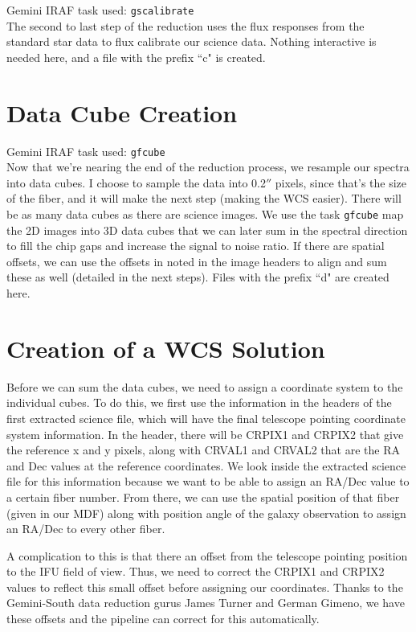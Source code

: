 \documentclass[12pt]{report}
\begin{document}
\noindent Gemini IRAF task used: \texttt{gscalibrate}\\

\noindent The second to last step of the reduction uses the flux responses from the standard star data to flux calibrate our science data. Nothing interactive is needed here, and a file with the prefix ``c" is created.

\bigskip
\section{Data Cube Creation}

\noindent Gemini IRAF task used: \texttt{gfcube}\\

\noindent Now that we're nearing the end of the reduction process, we resample our spectra into data cubes. I choose to sample the data into 0.2$''$ pixels, since that's the size of the fiber, and it will make the next step (making the WCS easier). There will be as many data cubes as there are science images. We use the task \texttt{gfcube} map the 2D images into 3D data cubes that we can later sum in the spectral direction to fill the chip gaps and increase the signal to noise ratio. If there are spatial offsets, we can use the offsets in noted in the image headers to align and sum these as well (detailed in the next steps). Files with the prefix ``d" are created here.

\bigskip
\section{Creation of a WCS Solution}

Before we can sum the data cubes, we need to assign a coordinate system to the individual cubes. To do this, we first use the information in the headers of the first extracted science file, which will have the final telescope pointing coordinate system information. In the header, there will be CRPIX1 and CRPIX2 that give the reference x and y pixels, along with CRVAL1 and CRVAL2 that are the RA and Dec values at the reference coordinates. We look inside the extracted science file for this information because we want to be able to assign an RA/Dec value to a certain fiber number. From there, we can use the spatial position of that fiber (given in our MDF) along with position angle of the galaxy observation to assign an RA/Dec to every other fiber.

A complication to this is that there an offset from the telescope pointing position to the IFU field of view. Thus, we need to correct the CRPIX1 and CRPIX2 values to reflect this small offset before assigning our coordinates. Thanks to the Gemini-South data reduction gurus James Turner and German Gimeno, we have these offsets and the pipeline can correct for this automatically. 
\end{document}
